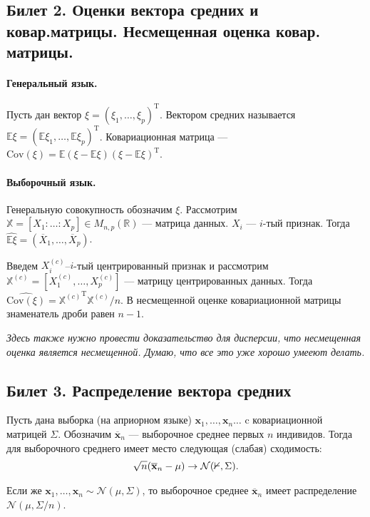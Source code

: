 \subsection{Билет 2. Оценки вектора средних и ковар.матрицы. Несмещенная оценка ковар. матрицы.}
\paragraph{Генеральный язык.}

Пусть дан вектор $\xi = (\xi_1, \ldots, \xi_p)^\mathrm T$. Вектором средних называется $\mathbb E\xi = (\mathbb E\xi_1, \ldots, \mathbb E\xi_p)^\mathrm T$.
Ковариационная матрица --- $\mathrm{Cov}(\xi) = \mathbb E(\xi-\mathbb E\xi)(\xi-\mathbb E\xi)^\mathrm T$.
\paragraph{Выборочный язык.}

Генеральную совокупность обозначим $\xi$.
Рассмотрим $\mathbb X = [X_1\colon\ldots\colon X_p] \in M_{n, p} (\mathbb R)$ --- матрица данных. $X_i$ --- $i$-тый признак. 
Тогда $\widehat{\mathbb E \xi} = \left(\overline X_1, \ldots, \overline X_p\right)$.

Введем $X_i^{(c)}$--$i$-тый центрированный признак и рассмотрим $\mathbb X^{(c)} = [X_1^{(c)}, \ldots, X_p^{(c)}]$ --- матрицу центрированных данных.
Тогда $\widehat{\mathrm {Cov}(\xi)} = {\mathbb X^{(c)}}^\mathrm T \mathbb X^{(c)} / n$. В несмещенной оценке ковариационной матрицы знаменатель дроби равен $n-1$.

\textit{Здесь также нужно провести доказательство для дисперсии, что несмещенная оценка является несмещенной. Думаю, что все это уже хорошо умееют делать.}

\subsection{Билет 3. Распределение вектора средних}
\begin{thm}
    Пусть дана выборка (на априорном языке) $\mathbf x_1, \ldots, \mathbf x_n \ldots$ c ковариационной матрицей $\Sigma$.
    Обозначим $\overline{\mathbf x}_n$ --- выборочное среднее первых $n$ индивидов.
    Тогда для выборочного среднего имеет место следующая (слабая) сходимость:
    \begin{gather*}
        \sqrt{n} (\overline{\mathbf x}_n - \mu) \to \mathcal N(\mathbb{0}, \Sigma).
    \end{gather*}

    Если же $\mathbf x_1, \ldots, \mathbf x_n \sim \mathcal N(\mu, \Sigma)$, то выборочное среднее $\overline{\mathbf x}_n$ имеет распределение $\mathcal N(\mu, \Sigma/n)$.
\end{thm}

